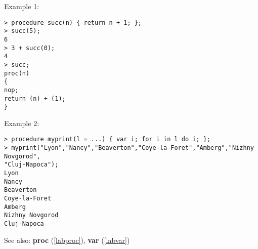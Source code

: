 \noindent Example 1: 
\begin{center}\begin{minipage}{15cm}\begin{Verbatim}[frame=single]
> procedure succ(n) { return n + 1; };
> succ(5);
6
> 3 + succ(0);
4
> succ;
proc(n)
{
nop;
return (n) + (1);
}
\end{Verbatim}
\end{minipage}\end{center}
\noindent Example 2: 
\begin{center}\begin{minipage}{15cm}\begin{Verbatim}[frame=single]
> procedure myprint(l = ...) { var i; for i in l do i; };
> myprint("Lyon","Nancy","Beaverton","Coye-la-Foret","Amberg","Nizhny Novgorod",
"Cluj-Napoca");
Lyon
Nancy
Beaverton
Coye-la-Foret
Amberg
Nizhny Novgorod
Cluj-Napoca
\end{Verbatim}
\end{minipage}\end{center}
See also: \textbf{proc} (\ref{labproc}), \textbf{var} (\ref{labvar})
